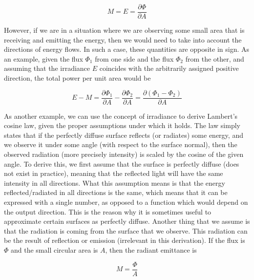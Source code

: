 \documentclass{article}
\begin{document}
\[ M = E = \frac{\partial \Phi}{\partial A} \]

 However, if we are in a situation where we are observing some small area that is receiving and emitting the energy, then we would need to take into account the directions of energy flows. In such a case, these quantities are opposite in sign. As an example, given the flux $\Phi_1$ from one side and the flux $\Phi_2$ from the other, and assuming that the irradiance $E$ coincides with the arbitrarily assigned positive direction, the total power per unit area would be

 \[ E - M = \frac{\partial \Phi_1}{\partial A} - \frac{\partial \Phi_2}{\partial A} =  \frac{\partial (\Phi_1 - \Phi_2)}{\partial A} \]

 As another example, we can use the concept of irradiance to derive Lambert's cosine law, given the proper assumptions under which it holds. The law simply states that if the perfectly diffuse surface reflects (or radiates) some energy, and we observe it under some angle (with respect to the surface normal), then the observed radiation (more precisely intensity) is scaled by the cosine of the given angle. To derive this, we first assume that the surface is perfectly diffuse (does not exist in practice), meaning that the reflected light will have the same intensity in all directions. What this assumption means is that the energy reflected/radiated in all directions is the same, which means that it can be expressed with a single number, as opposed to a function which would depend on the output direction. This is the reason why it is sometimes useful to approximate certain surfaces as perfectly diffuse. Another thing that we assume is that the radiation is coming from the surface that we observe. This radiation can be the result of reflection or emission (irrelevant in this derivation). If the flux is $\Phi$ and the small circular area is $A$, then the radiant emittance is

 \[ M = \frac{\Phi}{A} \]
\end{document}
